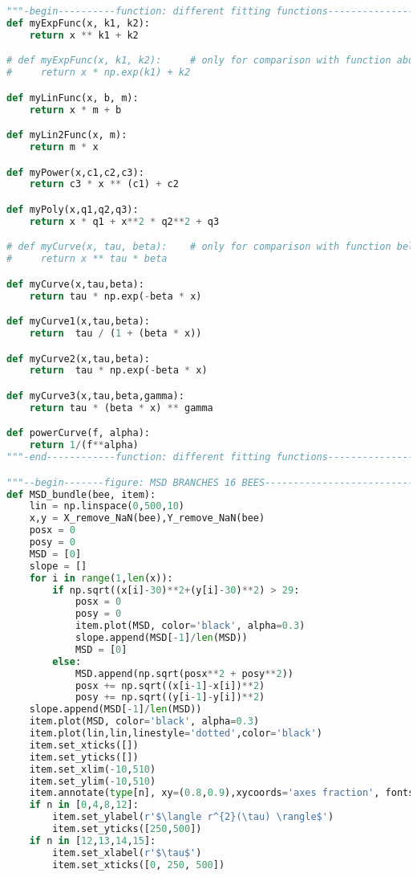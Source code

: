\begin{lstlisting}[language=Python, basicstyle=\tiny, frame=single, keywordstyle=\color{teal}, commentstyle=\color{olive}, stringstyle=\color{red}]
"""-begin----------function: different fitting functions---------------------"""
def myExpFunc(x, k1, k2):
    return x ** k1 + k2

# def myExpFunc(x, k1, k2):     # only for comparison with function above
#     return x * np.exp(k1) + k2

def myLinFunc(x, b, m):
    return x * m + b

def myLin2Func(x, m):
    return m * x

def myPower(x,c1,c2,c3):
    return c3 * x ** (c1) + c2

def myPoly(x,q1,q2,q3):
    return x * q1 + x**2 * q2**2 + q3

# def myCurve(x, tau, beta):    # only for comparison with function below
#     return x ** tau * beta

def myCurve(x,tau,beta):
    return tau * np.exp(-beta * x)

def myCurve1(x,tau,beta):
    return  tau / (1 + (beta * x))

def myCurve2(x,tau,beta):
    return  tau * np.exp(-beta * x)

def myCurve3(x,tau,beta,gamma):
    return tau * (beta * x) ** gamma

def powerCurve(f, alpha):
    return 1/(f**alpha)
"""-end------------function: different fitting functions---------------------"""

"""--begin-------figure: MSD BRANCHES 16 BEES--------------------------------"""
def MSD_bundle(bee, item):
    lin = np.linspace(0,500,10)
    x,y = X_remove_NaN(bee),Y_remove_NaN(bee)
    posx = 0
    posy = 0
    MSD = [0]
    slope = []
    for i in range(1,len(x)):
        if np.sqrt((x[i]-30)**2+(y[i]-30)**2) > 29:
            posx = 0
            posy = 0
            item.plot(MSD, color='black', alpha=0.3)
            slope.append(MSD[-1]/len(MSD))
            MSD = [0]
        else:
            MSD.append(np.sqrt(posx**2 + posy**2))
            posx += np.sqrt((x[i-1]-x[i])**2)
            posy += np.sqrt((y[i-1]-y[i])**2)
    slope.append(MSD[-1]/len(MSD))
    item.plot(MSD, color='black', alpha=0.3)
    item.plot(lin,lin,linestyle='dotted',color='black')
    item.set_xticks([])
    item.set_yticks([])
    item.set_xlim(-10,510)
    item.set_ylim(-10,510)
    item.annotate(type[n], xy=(0.8,0.9),xycoords='axes fraction', fontsize=12)
    if n in [0,4,8,12]:
        item.set_ylabel(r'$\langle r^{2}(\tau) \rangle$')
        item.set_yticks([250,500])
    if n in [12,13,14,15]:
        item.set_xlabel(r'$\tau$')
        item.set_xticks([0, 250, 500])


\end{lstlisting}
